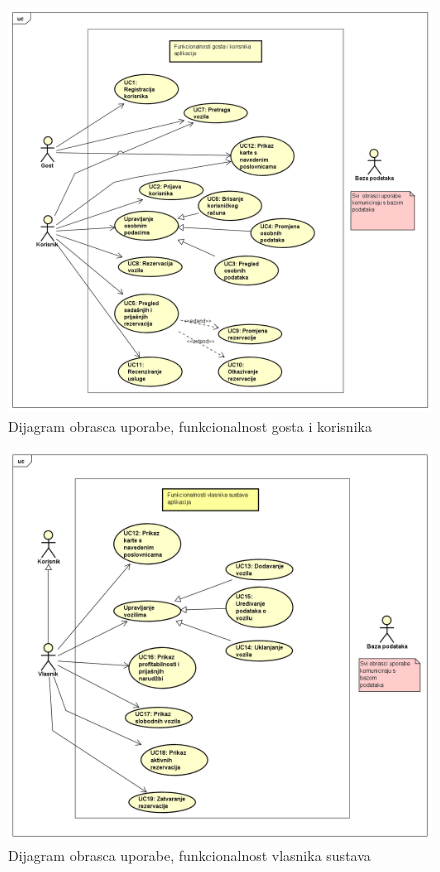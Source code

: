 				\begin{figure}[hp]
                    \centering
                    \includegraphics[width=15cm]{slike/UseCase Diagram0.png}
                    \caption{Dijagram obrasca uporabe, funkcionalnost gosta i korisnika}
                    \label{fig:useCase-0}
                \end{figure}
				\begin{figure}[hp]
                    \centering
                    \includegraphics[width=15cm]{slike/UseCaseDiagram1.png}
                    \caption{Dijagram obrasca uporabe, funkcionalnost vlasnika sustava}
                    \label{fig:useCase-1}
                \end{figure}
